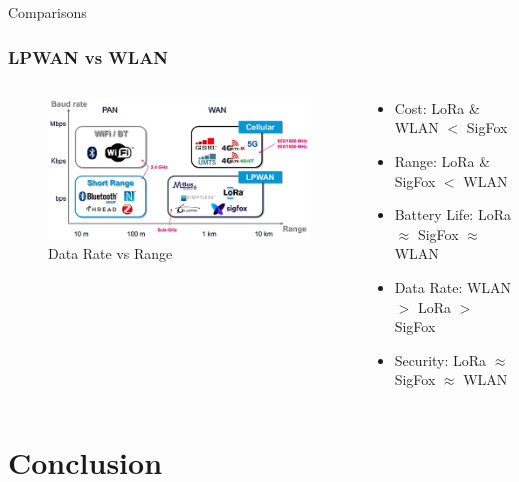 \documentclass{beamer}
\begin{document}
\begin{frame}{Comparisons}
  \frametitle{LPWAN vs WLAN}
  \begin{columns}
    \begin{column}{0.5\textwidth}
      \begin{figure}[htbp]
        \centering
        \includegraphics[width=\textwidth]{NetworkRangeDataRateGraph.jpg}
        \caption{Data Rate vs Range \cite{evanczukspeed}}
        \label{fig:Network_range_graph}
      \end{figure}
    \end{column}
    \begin{column}{0.5\textwidth}
      \begin{itemize}
        \item Cost: LoRa \& WLAN $<$ SigFox
        \item Range: LoRa \& SigFox $<$ WLAN
        \item Battery Life: LoRa $\approx$ SigFox $\approx$ WLAN
        \item Data Rate: WLAN $>$ LoRa $>$ SigFox
        \item Security: LoRa $\approx$ SigFox $\approx$ WLAN
      \end{itemize}
    \end{column}
  \end{columns}
\end{frame}

\section{Conclusion}
\end{document}
